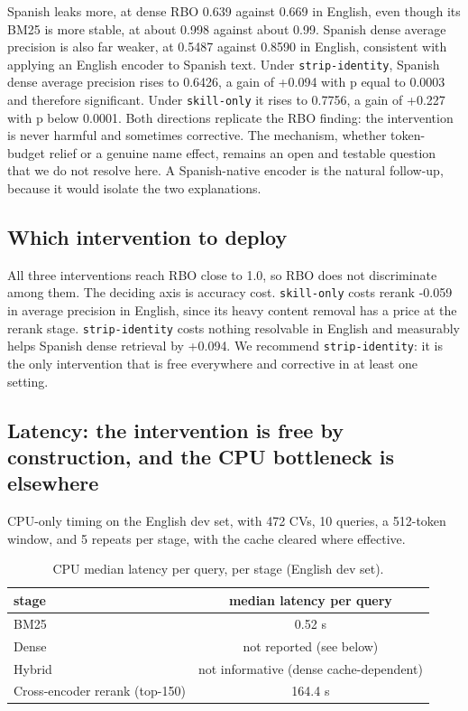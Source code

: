 \documentclass{ceurart}
\begin{document}
Spanish leaks more, at dense RBO 0.639 against 0.669 in English, even though its BM25 is
more stable, at about 0.998 against about 0.99. Spanish dense average precision is also far
weaker, at 0.5487 against 0.8590 in English, consistent with applying an English encoder to
Spanish text. Under \texttt{strip-identity}, Spanish dense average precision rises to
0.6426, a gain of +0.094 with p equal to 0.0003 and therefore significant. Under
\texttt{skill-only} it rises to 0.7756, a gain of +0.227 with p below 0.0001. Both
directions replicate the RBO finding: the intervention is never harmful and sometimes
corrective. The mechanism, whether token-budget relief or a genuine name effect, remains an
open and testable question that we do not resolve here. A Spanish-native encoder is the
natural follow-up, because it would isolate the two explanations.

\subsection{Which intervention to deploy}

All three interventions reach RBO close to 1.0, so RBO does not discriminate among them.
The deciding axis is accuracy cost. \texttt{skill-only} costs rerank -0.059 in average
precision in English, since its heavy content removal has a price at the rerank stage.
\texttt{strip-identity} costs nothing resolvable in English and measurably helps Spanish
dense retrieval by +0.094. We recommend \texttt{strip-identity}: it is the only
intervention that is free everywhere and corrective in at least one setting.

\subsection{Latency: the intervention is free by construction, and the CPU bottleneck is elsewhere}

CPU-only timing on the English dev set, with 472 CVs, 10 queries, a 512-token window, and 5
repeats per stage, with the cache cleared where effective.

\begin{table}[!htb]
\centering
\caption{CPU median latency per query, per stage (English dev set).}
\label{tab:latency}
\begin{tabular}{lc}
\toprule
stage & median latency per query \\
\midrule
BM25 & 0.52 s \\
Dense & not reported (see below) \\
Hybrid & not informative (dense cache-dependent) \\
Cross-encoder rerank (top-150) & 164.4 s \\
\bottomrule
\end{tabular}
\end{table}
\end{document}
